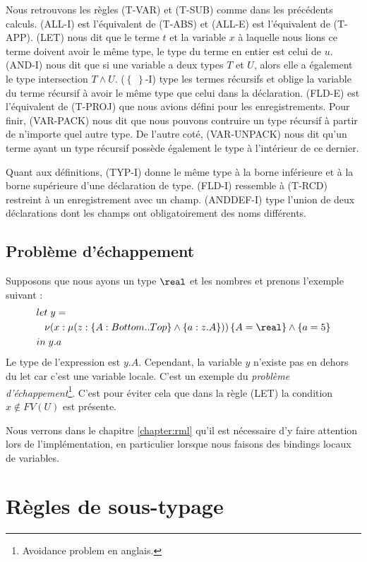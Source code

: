 Nous retrouvons les règles (T-VAR) et (T-SUB) comme dans les précédents calculs.
(ALL-I) est l'équivalent de (T-ABS) et (ALL-E) est l'équivalent de (T-APP).
(LET) nous dit que le terme $t$ et la variable $x$ à laquelle nous lions ce
terme doivent avoir le même type, le type du terme en entier est celui de $u$.
(AND-I) nous dit que si une variable a deux types $T$ et $U$, alors elle a
également le type intersection $T \wedge U$. ($\left\{ \; \right\}$-I) type les termes
récursifs et oblige la variable du terme récursif à avoir le même type que celui dans la déclaration.
(FLD-E) est l'équivalent de (T-PROJ) que nous avions défini pour les
enregistrements.
Pour finir, (VAR-PACK) nous dit que nous pouvons
contruire un type récursif à partir de n'importe quel autre type. De l'autre
coté, (VAR-UNPACK) nous dit qu'un terme ayant un type récursif possède également
le type à l'intérieur de ce dernier.

Quant aux définitions, (TYP-I) donne le même type à la borne inférieure et à la
borne supérieure d'une déclaration de type. (FLD-I) ressemble à (T-RCD)
restreint à un enregistrement avec un champ. (ANDDEF-I) type l'union de deux
déclarations dont les champs ont obligatoirement des noms différents.

\subsection*{Problème d'échappement}

Supposons que nous ayons un type $\real$ et les nombres et prenons l'exemple suivant :
\begin{align*}
  & let \; y = \\
  &\; \; \; \nu(x : \mu(z : \left\{ A : Bottom .. Top \right\} \wedge \left\{ a : z.A \right\})) \left\{ A = \real \right\} \wedge \left\{ a = 5 \right\} \\
  & in \; y.a
\end{align*}
Le type de l'expression est $y.A$. Cependant, la variable $y$ n'existe pas en
dehors du let car c'est une variable locale. C'est un exemple du
\textit{problème d'échappement}\footnote{\og Avoidance problem \fg \; en
anglais.}. C'est pour éviter cela que dans la règle (LET) la condition $x \notin
FV(U)$ est présente.

Nous verrons dans le chapitre \ref{chapter:rml} qu'il est nécessaire d'y faire
attention lors de l'implémentation, en particulier lorsque nous faisons des
bindings locaux de variables.

\section{Règles de sous-typage}

